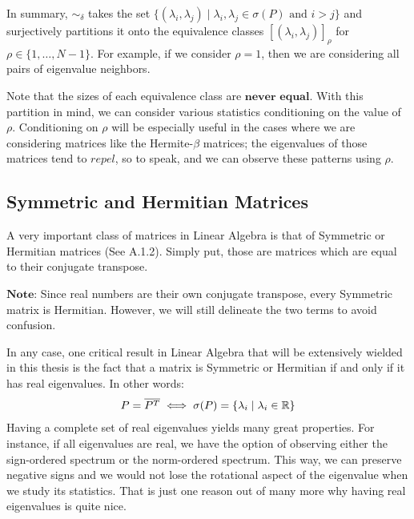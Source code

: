 In summary, $\sim_\delta$ takes the set $\{(\lambda_i, \lambda_j) \mid \lambda_i, \lambda_j \in \sigma(P) \text{ and } i > j \}$ and surjectively partitions it onto the equivalence classes $[(\lambda_i, \lambda_j)]_\rho$ for $\rho \in \{ 1,\dots,N-1\}$. For example, if we consider $\rho = 1$, then we are considering all pairs of eigenvalue neighbors.

Note that the sizes of each equivalence class are $\textbf{never equal}$. With this partition in mind, we can consider various statistics conditioning on the value of $\rho$. Conditioning on $\rho$ will be especially useful in the cases where we are considering matrices like the Hermite-$\beta$ matrices; the eigenvalues of those matrices tend to $\textit{repel}$, so to speak, and we can observe these patterns using $\rho$.


\subsection{Symmetric and Hermitian Matrices}

A very important class of matrices in Linear Algebra is that of Symmetric or Hermitian matrices (See A.1.2). Simply put, those are matrices which are equal to their conjugate transpose. 

$\textbf{Note:}$ Since real numbers are their own conjugate transpose, every Symmetric matrix is Hermitian. However, we will still delineate the two terms to avoid confusion.

In any case, one critical result in Linear Algebra that will be extensively wielded in this thesis is the fact that a matrix is Symmetric or Hermitian if and only if it has real eigenvalues. In other words:
\begin{align*}
P = \overline{P^{T}} \iff \sigma(P) = \{\lambda_i \mid \lambda_i \in \mathbb{R}\}
\end{align*}
Having a complete set of real eigenvalues yields many great properties. For instance, if all eigenvalues are real, we have the option of observing either the sign-ordered spectrum or the norm-ordered spectrum. This way, we can preserve negative signs and we would not lose the rotational aspect of the eigenvalue when we study its statistics. That is just one reason out of many more why having real eigenvalues is quite nice.


